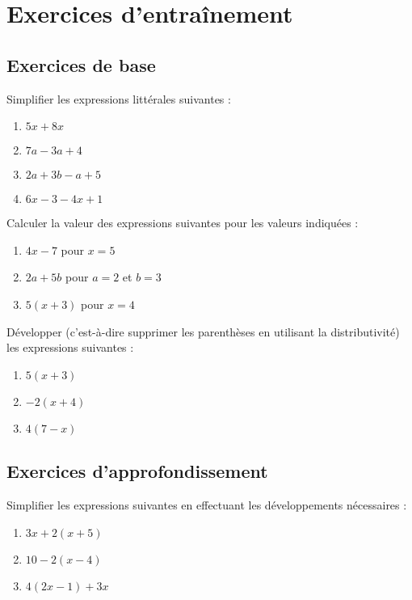 \section{Exercices d'entraînement}
\subsection{Exercices de base}
\begin{exercice}{4} Simplifier les expressions littérales suivantes : 
\begin{enumerate}[label=\alph*)] 
\item $5x + 8x$ 
\item $7a - 3a + 4$ 
\item $2a + 3b - a + 5$ 
\item $6x - 3 - 4x + 1$ 
\end{enumerate} 
\end{exercice}

\begin{exercice}{5} Calculer la valeur des expressions suivantes pour les valeurs indiquées : 
\begin{enumerate}[label=\alph*)] 
\item $4x - 7$ pour $x = 5$ 
\item $2a + 5b$ pour $a = 2$ et $b = 3$ 
\item $5(x + 3)$ pour $x = 4$ 
\end{enumerate} 
\end{exercice}

\begin{exercice}{6} Développer (c'est-à-dire supprimer les parenthèses en utilisant la distributivité) les expressions suivantes : 
\begin{enumerate}[label=\alph*)] 
\item $5(x + 3)$ 
\item $-2(x + 4)$ 
\item $4(7 - x)$ 
\end{enumerate} 
\end{exercice}

\subsection{Exercices d'approfondissement}
\begin{exercice}{7} Simplifier les expressions suivantes en effectuant les développements nécessaires : 
\begin{enumerate}[label=\alph*)] 
\item $3x + 2(x + 5)$ 
\item $10 - 2(x - 4)$ 
\item $4(2x - 1) + 3x$ 
\end{enumerate} 
\end{exercice}

